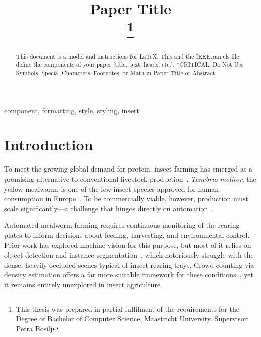 \documentclass[conference]{IEEEtran}
\begin{document}
\title{Paper Title\\
\thanks{This thesis was prepared in partial fulfilment of the requirements for the Degree of Bachelor of Computer Science, Maastricht University. Supervisor: Petra Bosilj}
}

\author{
}

\maketitle

\begin{abstract}
This document is a model and instructions for \LaTeX.
This and the IEEEtran.cls file define the components of your paper [title, text, heads, etc.]. *CRITICAL: Do Not Use Symbols, Special Characters, Footnotes, 
or Math in Paper Title or Abstract.
\end{abstract}

\begin{IEEEkeywords}
component, formatting, style, styling, insert
\end{IEEEkeywords}

\section{Introduction}
\label{sec:intro}
To meet the growing global demand for protein, insect farming has emerged as a
promising alternative to conventional livestock production~\cite{vanhuis2013}.
\textit{Tenebrio molitor}, the yellow mealworm, is one of the few insect species
approved for human consumption in Europe~\cite{eu2021tenebrio}. To be
commercially viable, however, production must scale significantly---a challenge
that hinges directly on automation~\cite{rumpold2013}.

Automated mealworm farming requires continuous monitoring of the rearing plates
to inform decisions about feeding, harvesting, and environmental control. Prior
work has explored machine vision for this purpose, but most of it relies on
object detection and instance segmentation~\cite{majewski2022multipurpose,
Papadopoulos2024TenebrioVision}, which notoriously struggle with the dense,
heavily occluded scenes typical of insect rearing trays. Crowd counting via
density estimation offers a far more suitable framework for these
conditions~\cite{Sindagi2017ASO}, yet it remains entirely unexplored in insect
agriculture.
\end{document}
